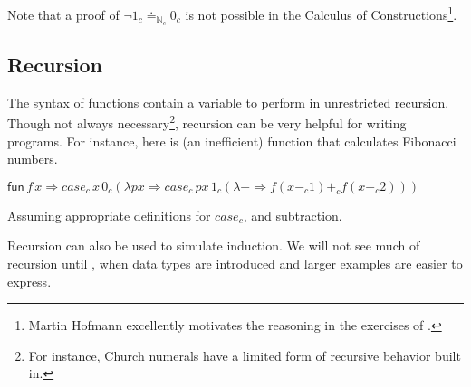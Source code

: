 

Note that a proof of $\lnot1_{c}\doteq_{\mathbb{N}_{c}}0_{c}$ is not possible in the Calculus of Constructions\cite{10.2307/2274575}\footnote{
  Martin Hofmann excellently motivates the reasoning in the exercises of \cite{hofmann_1997}.
}.

\subsection{Recursion}

The syntax of functions contain a variable to perform in unrestricted recursion.
Though not always necessary\footnote{
  For instance, Church numerals have a limited form of recursive behavior built in.
}, recursion can be very helpful for writing programs.
For instance, here is (an inefficient) function that calculates Fibonacci numbers.

$\mathsf{fun}\,f\,x\Rightarrow case_{c}\,x\,0_{c}\left(\lambda px\Rightarrow case_{c}\,px\,1_{c}\left(\lambda-\Rightarrow f\left(x-_{c}1\right)+_{c}f\left(x-_{c}2\right)\right)\right)$

Assuming appropriate definitions for $case_{c}$, and subtraction.

Recursion can also be used to simulate induction. 
We will not see much of recursion until , when data types are introduced and larger examples are easier to express.
